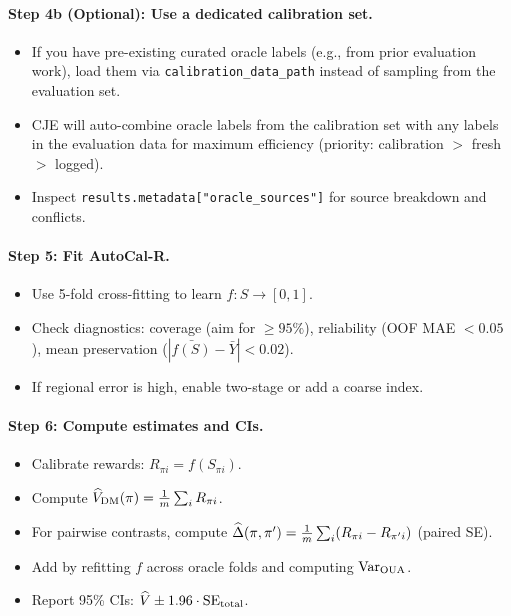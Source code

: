 \paragraph{Step 4b (Optional): Use a dedicated calibration set.}
\begin{itemize}
\item If you have pre-existing curated oracle labels (e.g., from prior evaluation work), load them via \texttt{calibration\_data\_path} instead of sampling from the evaluation set.
\item CJE will auto-combine oracle labels from the calibration set with any labels in the evaluation data for maximum efficiency (priority: calibration $>$ fresh $>$ logged).
\item Inspect \texttt{results.metadata["oracle\_sources"]} for source breakdown and conflicts.
\end{itemize}

\paragraph{Step 5: Fit AutoCal-R.}
\begin{itemize}
\item Use 5-fold cross-fitting to learn $f: S \to [0, 1]$.
\item Check diagnostics: coverage (aim for $\ge 95\%$), reliability (OOF MAE $< 0.05$), mean preservation ($|\bar{f(S)} - \bar{Y}| < 0.02$).
\item If regional error is high, enable two-stage \autocal{} or add a coarse index.
\end{itemize}

\paragraph{Step 6: Compute estimates and CIs.}
\begin{itemize}
\item Calibrate rewards: $R_{\pi i} = f(S_{\pi i})$.
\item Compute $\widehat{V}_{\text{DM}}(\pi) = \frac{1}{m} \sum_i R_{\pi i}$.
\item For pairwise contrasts, compute $\widehat{\Delta}(\pi, \pi') = \frac{1}{m} \sum_i (R_{\pi i} - R_{\pi' i})$ (paired SE).
\item Add \oua{} by refitting $f$ across oracle folds and computing $\operatorname{Var}_{\text{OUA}}$.
\item Report 95\% CIs: $\widehat{V} \pm 1.96 \cdot \operatorname{SE}_{\text{total}}$.
\end{itemize}

